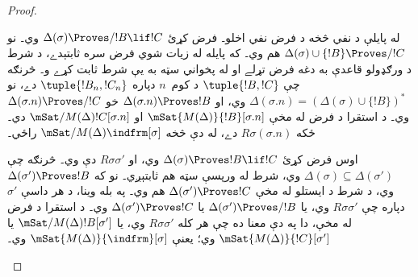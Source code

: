 \documentclass[../../../include/open-logic-section]{subfiles}
\begin{document}
\begin{proof}
\begin{enumerate}
{        له پايلې د نفي څخه د فرض نفي اخلو۔ فرض کړئ $\Delta(\sigma)
        \Proves/ !B \lif !C$ وي۔ نو $\Delta(\sigma) \cup
        \{!B\} \Proves/ !C$ هم وي۔ که پايله له زيات شوي
        فرض سره ثابتېدے، د شرط د ورګډولو قاعدې به دغه فرض
        تړلے او له پخواني سټه به يې شرط ثابت کړے و۔ څرنګه چې
        $\tuple{!B, !C}$ د کوم~$n$ دپاره $\tuple{!B_n, !C_n}$
        دے، نو $\Delta(\sigma.n) = (\Delta(\sigma) \cup
        \{!B\})^*$ وي، او $\Delta(\sigma.n) \Proves !B$ خو
        $\Delta(\sigma.n) \Proves/ !C$ وي۔ د استقرا د فرض له
        مخې $\mSat{M(\Delta)}{!B}[\sigma.n]$ او
        $\mSat/{M(\Delta)}{!C}[\sigma.n]$ دي۔ ځکه
        $R\sigma(\sigma.n)$ دے، له دې څخه
        $\mSat/{M(\Delta)}{\indfrm}[\sigma]$ راځي۔

        اوس فرض کړئ $\Delta(\sigma) \Proves !B \lif !C$ وي،
        او $R\sigma\sigma'$ دې وي۔ څرنګه چې $\Delta(\sigma)
        \subseteq \Delta(\sigma')$ وي، شرط له ورپسې سټه هم
        ثابتېږي۔ نو که $\Delta(\sigma') \Proves !B$ وي، د
        شرط د ايستلو له مخې $\Delta(\sigma') \Proves !C$ هم وي۔
        په بله وينا، د هر
        داسې $\sigma'$ دپاره چې $R\sigma\sigma'$ وي، يا
        $\Delta(\sigma') \Proves/ !B$ يا
        $\Delta(\sigma') \Proves !C$ وي۔ د استقرا د فرض له
        مخې، دا په دې معنا ده چې هر کله $R\sigma\sigma'$ وي،
        يا $\mSat/{M(\Delta)}{!B}[\sigma']$ يا
        $\mSat{M(\Delta)}{!C}[\sigma']$ وي؛ يعنې
        $\mSat{M(\Delta)}{\indfrm}[\sigma]$ وي۔}
  \end{enumerate}
\end{proof}
\end{document}
